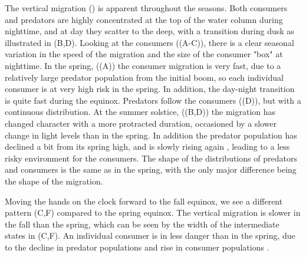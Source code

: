 The vertical migration () is apparent throughout the seasons. Both consumers and predators are highly concentrated at the top of the water column during nighttime, and at day they scatter to the deep, with a transition during dusk as illustrated in (B,D). Looking at the consumers ((A-C)), there is a clear seasonal variation in the speed of the migration and the size of the consumer "box" at nighttime. In the spring, ((A)) the consumer migration is very fast, due to a relatively large predator population from the initial boom, so each individual consumer is at very high risk in the spring. In addition, the day-night transition is quite fast during the equinox. Predators follow the consumers ((D)), but with a continuous distribution.
At the summer solstice, ((B,D)) the migration has changed character with a more protracted duration, occasioned by a slower change in light levels than in the spring. In addition the predator population has declined a bit from its spring high, and is slowly rising again , leading to a less risky environment for the consumers. The shape of the distributions of predators and consumers is the same as in the spring, with the only major difference being the shape of the migration.

Moving the hands on the clock forward to the fall equinox, we see a different pattern (C,F) compared to the spring equinox. The vertical migration is slower in the fall than the spring, which can be seen by the width of the intermediate states in (C,F). An individual consumer is in less danger than in the spring, due to the decline in predator populations and rise in consumer populations .





